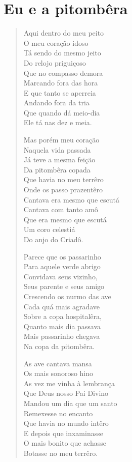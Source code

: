 \chapter{Eu e a pitombêra}

\begin{verse}
Aqui dentro do meu peito\\
O meu coração idoso\\
Tá sendo do mesmo jeito\\
Do relojo priguiçoso\\
Que no compasso demora\\
Marcando fora das hora\\
E que tanto se aperreia\\
Andando fora da tria\\
Que quando dá meio-dia\\
Ele tá nas dez e meia.

Mas porém meu coração\\
Naquela vida passada\\
Já teve a mesma feição\\
Da pitombêra copada\\
Que havia no meu terrêro\\
Onde os passo prazentêro\\
Cantava era mesmo que escutá\\
Cantava com tanto amô\\
Que era mesmo que escutá\\
Um coro celestiá\\
Do anjo do Criadô.

Parece que os passarinho\\
Para aquele verde abrigo\\
Convidava seus vizinho,\\
Seus parente e seus amigo\\
Crescendo os nurmo das ave\\
Cada quá mais agradave\\
Sobre a copa hospitalêra,\\
Quanto mais dia passava\\
Mais passarinho chegava\\
Na copa da pitombêra.

As ave cantava mansa\\
Os mais sonoroso hino\\
As vez me vinha à lembrança\\
Que Deus nosso Pai Divino\\
Mandou um dia que um santo\\
Remexesse no encanto\\
Que havia no mundo intêro\\
E depois que inxaminasse\\
O mais bonito que achasse\\
Botasse no meu terrêro.


\end{verse}
